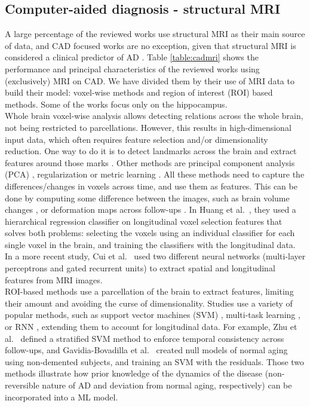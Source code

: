 \subsection{Computer-aided diagnosis - structural MRI}

A large percentage of the reviewed works use structural MRI as their main source of data, and CAD focused works are no exception, given that structural MRI is considered a clinical predictor of AD \cite{Adaszewski2013}. Table \ref{table:cadmri} shows the performance and principal characteristics of the reviewed works using (exclusively) MRI on CAD. We have divided them by their use of MRI data to build their model: voxel-wise methods and region of interest (ROI) based methods. Some of the works focus only on the hippocampus. \\ 

Whole brain voxel-wise analysis allows detecting relations across the whole brain, not being restricted to parcellations. However, this results in high-dimensional input data, which often requires feature selection and/or dimensionality reduction. One way to do it is to detect landmarks across the brain and extract features around those marks \cite{Farzan2015,Zhang2017a}. Other methods are principal component analysis (PCA) \cite{Aksman2016,Farzan2015,Sun2017}, regularization \cite{Ortiz2017} or metric learning \cite{Shi2015}. All these methods need to capture the differences/changes in voxels across time, and use them as features. This can be done by computing some difference between the images, such as brain volume changes \cite{Farzan2015}, or deformation maps across follow-ups \cite{Davatzikos2009,Misra2009,Sun2017}. In Huang et al.\ \cite{Huang2016b}, they used a hierarchical regression classifier on longitudinal voxel selection features that solves both problems: selecting the voxels using an individual classifier for each single voxel in the brain, and training the classifiers with the longitudinal data. In a more recent study, Cui et al.\ \cite{Cui2018} used two different neural networks (multi-layer perceptrons and gated recurrent units) to extract spatial and longitudinal features from MRI images. \\ 

ROI-based methods use a parcellation of the brain to extract features, limiting their amount and avoiding the curse of dimensionality. Studies use a variety of popular methods, such as support vector machines (SVM) \cite{Gavidia-Bovadilla2017,Guan2017,Li2012,Zhu2016a}, multi-task learning \cite{Liu2013}, or RNN \cite{Ghazi2019}, extending them to account for longitudinal data. For example, Zhu et al.\ \cite{Zhu2016a} defined a stratified SVM method to enforce temporal consistency across follow-ups, and Gavidia-Bovadilla et al.\ \cite{Gavidia-Bovadilla2017} created null models of normal aging using non-demented subjects, and training an SVM with the residuals. Those two methods illustrate how prior knowledge of the dynamics of the disease (non-reversible nature of AD and deviation from normal aging, respectively) can be incorporated into a ML model. \\

